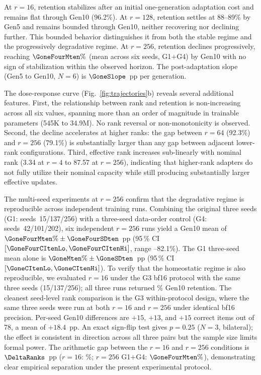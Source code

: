 \documentclass[a4paper,fleqn]{cas-dc}
\newif\ifshowchanges
\newcommand{\rev}[1]{\ifshowchanges{\color{blue}#1}\else{#1}\fi}
\begin{document}
At $r=16$, retention stabilizes after
an initial one-generation adaptation cost and remains flat through Gen10
(96.2\%). At $r=128$, retention settles at
88--89\% by Gen5 and remains bounded through Gen10, neither
recovering nor declining further. This bounded behavior distinguishes it from
both the stable regime and the progressively degradative regime. At
$r=256$, retention declines progressively,
reaching \rev{$\GoneFourMten\%$} (mean across \rev{six seeds, G1$+$G4}) by Gen10 with no sign of
stabilization within the observed horizon. The post-adaptation slope
\rev{(Gen5 to Gen10, $N=6$) is $\GoneSlope$~pp per generation.}

The dose-response curve (Fig.~\ref{fig:trajectories}b) reveals several
additional features. First, the
relationship between rank and retention is non-increasing across all
six values, spanning more than an order of magnitude in trainable parameters
(545K to 34.9M). No rank reversal or non-monotonicity is observed. Second, the
decline accelerates at higher ranks: the gap between $r=64$ (92.3\%) and $r=256$
(79.1\%) is substantially larger than any gap between adjacent lower-rank
configurations. Third, effective rank increases sub-linearly with nominal rank
(3.34 at $r=4$ to 87.57 at $r=256$), indicating that higher-rank adapters do not
fully utilize their nominal capacity while still producing substantially larger
effective updates.

The multi-seed experiments at $r=256$ confirm that the degradative regime is
reproducible across independent training runs.
\rev{Combining the original three seeds (G1: seeds~15/137/256) with a three-seed
data-order control (G4: seeds~42/101/202), six independent $r=256$ runs
yield a Gen10 mean of $\GoneFourMten\%\pm\GoneFourSDten$~pp
(95\,\% CI $[\GoneFourCItenLo, \GoneFourCItenHi]$, range \GoneSeedFifteenTen--82.1\%).
The G1 three-seed mean alone is $\GoneMten\%\pm\GoneSDten$~pp
(95\,\% CI $[\GoneCItenLo, \GoneCItenHi]$).}
To verify that the homeostatic regime is also reproducible, we evaluated $r=16$
under the G3 bf16 protocol with the same three seeds (15/137/256); all three runs
returned \RsixteenMten\% Gen10 retention.
\rev{The cleanest seed-level rank comparison is the G3 within-protocol design,
where the same three seeds were run at both $r=16$ and $r=256$ under identical
bf16 precision. Per-seed Gen10 differences are $+15$, $+13$, and $+15$ correct
items out of 78, a mean of $+18.4$~pp. An exact sign-flip test gives $p=0.25$
($N=3$, bilateral); the effect is consistent in direction across all three pairs
but the sample size limits formal power.}
The arithmetic gap between the $r=16$ and $r=256$ conditions is
$\DeltaRanks$~pp ($r=16$: \RsixteenMten\%; $r=256$ G1$+$G4: $\GoneFourMten\%$),
demonstrating clear empirical separation under the present experimental protocol.
\end{document}
